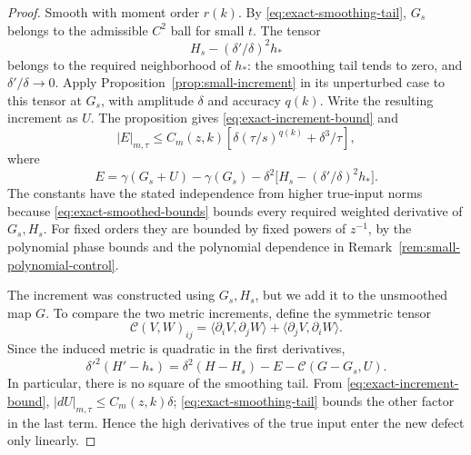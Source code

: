 \begin{proof}
Smooth with moment order $r(k)$.  By
\eqref{eq:exact-smoothing-tail}, $G_s$ belongs to the admissible
$C^2$ ball for small $t$.  The tensor
\[
 H_s-(\delta'/\delta)^2h_*
\]
belongs to the required neighborhood of $h_*$: the smoothing tail
tends to zero, and $\delta'/\delta\to0$.  Apply
Proposition~\ref{prop:small-increment} in its unperturbed case to this
tensor at $G_s$, with amplitude $\delta$ and accuracy $q(k)$.  Write
the resulting increment as $U$.  The proposition gives
\eqref{eq:exact-increment-bound} and
\begin{equation}\label{eq:exact-mode-error}
 |E|_{m,\tau}\le C_m(z,k)
 \left[\delta(\tau/s)^{q(k)}+\delta^3/\tau\right],
\end{equation}
where
\[
 E=\gamma(G_s+U)-\gamma(G_s)
   -\delta^2\bigl[H_s-(\delta'/\delta)^2h_*\bigr].
\]
The constants have the stated independence from higher true-input
norms because \eqref{eq:exact-smoothed-bounds} bounds every required
weighted derivative of $G_s,H_s$.  For fixed orders they are bounded
by fixed powers of $z^{-1}$, by the polynomial phase bounds and the
polynomial dependence in Remark~\ref{rem:small-polynomial-control}.

The increment was constructed using $G_s,H_s$, but we add it to the
unsmoothed map $G$.  To compare the two metric increments, define the
symmetric tensor
\[
 \mathcal C(V,W)_{ij}
 =\langle\partial_iV,\partial_jW\rangle
  +\langle\partial_jV,\partial_iW\rangle.
\]
Since the induced metric is quadratic in the first derivatives,
\begin{equation}\label{eq:exact-error-identity}
 \delta'^2(H'-h_*)
 =\delta^2(H-H_s)-E-\mathcal C(G-G_s,U).
\end{equation}
In particular, there is no square of the smoothing tail.  From
\eqref{eq:exact-increment-bound}, $|dU|_{m,\tau}\le C_m(z,k)\delta$;
\eqref{eq:exact-smoothing-tail} bounds the other factor in the last
term.  Hence the high derivatives of the true input enter the new
defect only linearly.


\end{proof}
